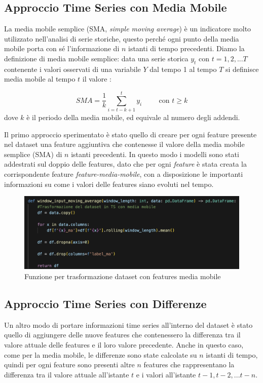 \subsection{Approccio Time Series con Media Mobile}
La media mobile semplice (SMA, \textit{simple moving average}) \`e un indicatore molto utilizzato nell'analisi di serie storiche, questo perch\'e ogni punto della media mobile porta con s\'e l'informazione di $n$ istanti di tempo precedenti. Diamo la definizione di media mobile semplice: data una serie storica $y_t$ con $t=1,2,...T$ contenente i valori osservati di una variabile $Y$ dal tempo 1 al tempo $T$ si definisce media mobile al tempo $t$ il valore \cite{sma}:

  \begin{equation}
      SMA=\frac{1}{k} \sum_{i=t-k+1}^{t} y_{i} \hspace{1cm} \text{con $t \geq k$}
  \end{equation} 
dove $k$ \`e il periodo della media mobile, ed equivale al numero degli addendi.

Il primo approccio sperimentato \`e stato quello di creare per ogni feature presente nel dataset una feature aggiuntiva che contenesse il valore della media mobile semplice (SMA) di $n$ istanti precedenti. In questo modo i modelli sono stati addestrati sul doppio delle features, dato che per ogni \textit{feature} \`e stata creata la corrispondente feature \textit{feature-media-mobile}, con a disposizione le importanti informazioni su come i valori delle features siano evoluti nel tempo. 

\begin{figure}[H]
    \centering
    \includegraphics[width=0.9\linewidth]{def_ts_ma.png}
    \caption{Funzione per trasformazione dataset con features media mobile}
    \label{fig:enter-label}
\end{figure}

 
\subsection{Approccio Time Series con Differenze}
Un altro modo di portare informazioni time series all'interno del dataset \`e stato quello di aggiungere delle nuove features che contenessero la differenza tra il valore attuale delle features e il loro valore precedente. Anche in questo caso, come per la media mobile, le differenze sono state calcolate su $n$ istanti di tempo, quindi per ogni feature sono presenti altre $n$ features che rappresentano la differenza tra il valore attuale all'istante $t$ e i valori all'istante $t-1,t-2,...t-n$.

